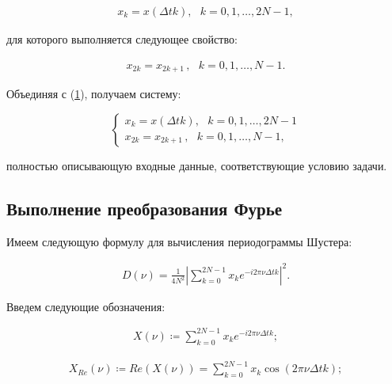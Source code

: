 \documentclass[12pt]{article}
\newcommand{\hl}[1]{(\hyperlink{eq:#1}{#1})}
\newcommand{\s}[2]{\hypertarget{skip:#1}{\vspace{#2pt}}}
\newcommand{\sd}[1]{\hypertarget{skip:#1}{\vspace{-10pt}}}
\newcommand{\hep}[2]{\vspace{#2pt}\hypertarget{eq:#1}{}\vspace{-#2pt}}
\newcommand{\hs}[1]{\sd{#1}\hep{#1}{18}}
\begin{document}
\hs{1}
\begin{gather}
    x_k = x\left(\Delta t k\right) , \hspace{8pt} k = 0, 1, \ldots, 2N - 1,
\end{gather}

для которого выполняется следующее свойство:

\hs{2}
\begin{gather}
    x_{2k} = x_{2k+1} \hspace{2pt} , \hspace{8pt} k = 0, 1, \ldots, N - 1.
\end{gather}

Объединяя с \hl{1}, получаем систему:

\hep{3}{8}
\begin{equation}
    \begin{cases}
        x_k = x\left(\Delta t k\right) , \hspace{8pt} k = 0, 1, \ldots, 2N - 1 \\
        x_{2k} = x_{2k+1} \hspace{2pt} , \hspace{8pt} k = 0, 1, \ldots, N - 1 ,
    \end{cases}
\end{equation}

\vspace{5pt}

полностью описывающую входные данные, соответствующие условию задачи.

\subsection{Выполнение преобразования Фурье}

Имеем следующую формулу для вычисления периодограммы Шустера:

\hs{4}
\begin{gather}
    D(\nu) = \frac{1}{4 N^2} \left| \sum_{k = 0}^{2 N - 1} x_k e^{-i 2 \pi \nu \Delta t k} \right|^2.
\end{gather}

Введем следующие обозначения:

\sd{5}
\begin{gather}
    X( \nu ) \coloneqq \sum_{k = 0}^{2 N - 1} x_k e^{-i 2 \pi \nu \Delta t k };
\end{gather}

\s{6}{-20}\hep{6}{10}
\begin{gather}
    X_{Re}(\nu) \coloneqq {Re}(X(\nu)) = \sum_{k = 0}^{2 N - 1} x_k \cos(2 \pi \nu \Delta t k);
\end{gather}
\end{document}
